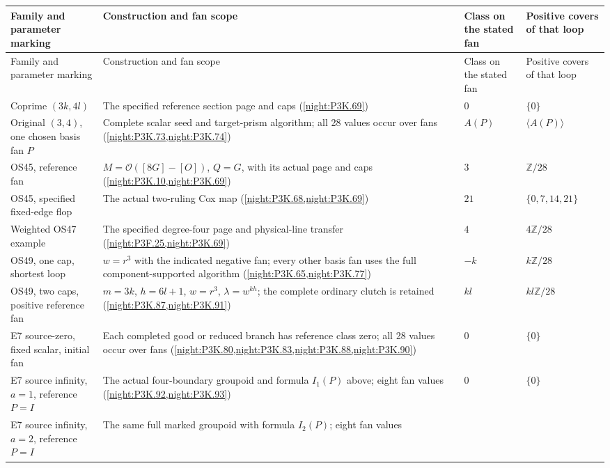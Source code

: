 \begingroup
\small
\setlength{\tabcolsep}{4pt}
\renewcommand{\arraystretch}{1.18}
\begin{longtable}{@{}p{.23\linewidth}p{.37\linewidth}p{.16\linewidth}p{.17\linewidth}@{}}
\toprule
Family and parameter marking & Construction and fan scope
 & Class on the stated fan & Positive covers of that loop\\
\midrule
\endfirsthead
\toprule
Family and parameter marking & Construction and fan scope
 & Class on the stated fan & Positive covers of that loop\\
\midrule
\endhead
\bottomrule
\endfoot
Coprime $(3k,4l)$ & The specified reference section page and caps
  (\cref{night:P3K.69}) & $0$ & $\{0\}$\\
Original $(3,4)$, one chosen basis fan $P$ & Complete scalar
  seed and target-prism algorithm; all 28 values occur over fans
  (\cref{night:P3K.73,night:P3K.74})
  & $A(P)$ & $\langle A(P)\rangle$\\
OS45, reference fan & $M=\mathcal O([8G]-[O])$, $Q=G$,
  with its actual page and caps
  (\cref{night:P3K.10,night:P3K.69})
  & $3$ & $\mathbb Z/28$\\
OS45, specified fixed-edge flop & The actual two-ruling Cox map
  (\cref{night:P3K.68,night:P3K.69})
  & $21$ & $\{0,7,14,21\}$\\
Weighted OS47 example & The specified degree-four page and
  physical-line transfer (\cref{night:P3F.25,night:P3K.69})
  & $4$ & $4\mathbb Z/28$\\
OS49, one cap, shortest loop & $w=r^3$ with the indicated
  negative fan; every other basis fan uses the full component-supported
  algorithm (\cref{night:P3K.65,night:P3K.77})
  & $-k$ & $k\mathbb Z/28$\\
OS49, two caps, positive reference fan & $m=3k$, $h=6l+1$,
  $w=r^3$, $\lambda=w^{kh}$; the complete ordinary clutch is retained
  (\cref{night:P3K.87,night:P3K.91})
  & $kl$ & $kl\mathbb Z/28$\\
E7 source-zero, fixed scalar, initial fan & Each completed good
  or reduced branch has reference class zero; all 28 values occur
  over fans (\cref{night:P3K.80,night:P3K.83,night:P3K.88,night:P3K.90})
  & $0$ & $\{0\}$\\
E7 source infinity, $a=1$, reference $P=I$ & The actual four-boundary
  groupoid and formula $I_1(P)$ above; eight fan values
  (\cref{night:P3K.92,night:P3K.93})
  & $0$ & $\{0\}$\\
E7 source infinity, $a=2$, reference $P=I$ & The same full
  marked groupoid with formula $I_2(P)$; eight fan values

\end{longtable}
